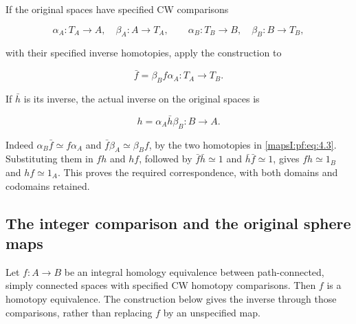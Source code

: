 If the original spaces have specified CW comparisons

\begin{equation}
\alpha_A:T_A\to A,\quad\beta_A:A\to T_A,\qquad
\alpha_B:T_B\to B,\quad\beta_B:B\to T_B,
\label{mapsI:pf:eq:4.3}
\end{equation}

with their specified inverse homotopies, apply the construction to

\begin{equation}
\bar f=\beta_B f\alpha_A:T_A\to T_B.
\label{mapsI:pf:eq:4.4}
\end{equation}

If \(\bar h\) is its inverse, the actual inverse on the original spaces is

\begin{equation}
h=\alpha_A\bar h\beta_B:B\to A.
\label{mapsI:pf:eq:4.5}
\end{equation}

Indeed \(\alpha_B\bar f\simeq f\alpha_A\) and \(\bar f\beta_A\simeq\beta_Bf\), by the two homotopies in \eqref{mapsI:pf:eq:4.3}. Substituting them in \(fh\) and \(hf\), followed by \(\bar f\bar h\simeq1\) and \(\bar h\bar f\simeq1\), gives \(fh\simeq1_B\) and \(hf\simeq1_A\). This proves the required correspondence, with both domains and codomains retained.

\subsection{The integer comparison and the original sphere maps}
\label{mapsI:pf:integral-comparison}

\begin{theorem}
\label{mapsI:pf:theorem:5.1}
Let \(f:A\to B\) be an integral homology equivalence between path-connected, simply connected spaces with specified CW homotopy comparisons. Then \(f\) is a homotopy equivalence. The construction below gives the inverse through those comparisons, rather than replacing \(f\) by an unspecified map.
\end{theorem}

